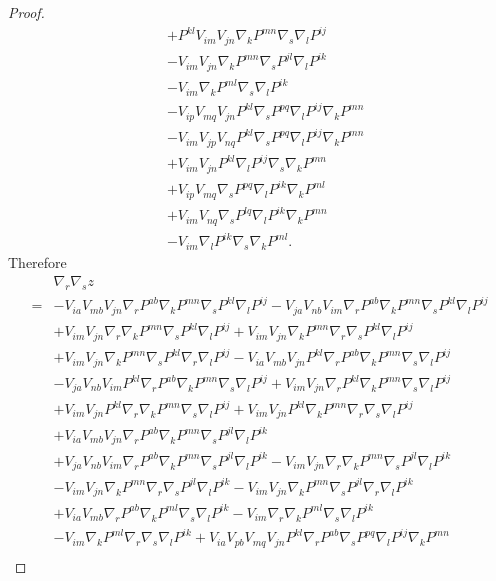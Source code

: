 \documentclass{amsart}
\theoremstyle{definition}
\theoremstyle{remark}
\numberwithin{equation}{section}
\begin{document}
\begin{proof}
\begin{align*}
&+P^{kl}V_{im}V_{jn}\nabla_kP^{mn}\nabla_s\nabla_l P^{ij}\\
&-V_{im}V_{jn}\nabla_kP^{mn}\nabla_sP^{jl}\nabla_lP^{ik}\\
&-V_{im}\nabla_kP^{ml}\nabla_s\nabla_lP^{ik}\\
&-V_{ip}V_{mq}V_{jn}P^{kl}\nabla_sP^{pq}\nabla_l P^{ij}\nabla_kP^{mn}\\
&-V_{im}V_{jp}V_{nq}P^{kl}\nabla_sP^{pq}\nabla_l P^{ij}\nabla_kP^{mn}\\
&+V_{im}V_{jn}P^{kl}\nabla_l P^{ij}\nabla_s\nabla_kP^{mn}\\
&+V_{ip}V_{mq}\nabla_sP^{pq}\nabla_lP^{ik}\nabla_kP^{ml}\\
&+V_{im}V_{nq}\nabla_sP^{lq}\nabla_lP^{ik}\nabla_kP^{mn}\\
&-V_{im}\nabla_lP^{ik}\nabla_s\nabla_kP^{ml}.
\end{align*}
Therefore
\begin{align*}
&\nabla_r\nabla_s z\\
=&-V_{ia}V_{mb}V_{jn}\nabla_r P^{ab}\nabla_kP^{mn}\nabla_s P^{kl}\nabla_l P^{ij}-V_{ja}V_{nb}V_{im}\nabla_r P^{ab}\nabla_kP^{mn}\nabla_s P^{kl}\nabla_l P^{ij}\\
&+V_{im}V_{jn}\nabla_r\nabla_kP^{mn}\nabla_s P^{kl}\nabla_l P^{ij}+V_{im}V_{jn}\nabla_kP^{mn}\nabla_r\nabla_s P^{kl}\nabla_l P^{ij}\\
&+V_{im}V_{jn}\nabla_kP^{mn}\nabla_s P^{kl}\nabla_r\nabla_l P^{ij}-V_{ia}V_{mb}V_{jn}P^{kl}\nabla_rP^{ab}\nabla_kP^{mn}\nabla_s\nabla_l P^{ij}\\
&-V_{ja}V_{nb}V_{im}P^{kl}\nabla_rP^{ab}\nabla_kP^{mn}\nabla_s\nabla_l P^{ij}+V_{im}V_{jn}\nabla_rP^{kl}\nabla_kP^{mn}\nabla_s\nabla_l P^{ij}\\
&+V_{im}V_{jn}P^{kl}\nabla_r\nabla_kP^{mn}\nabla_s\nabla_l P^{ij}+V_{im}V_{jn}P^{kl}\nabla_kP^{mn}\nabla_r\nabla_s\nabla_l P^{ij}\\
&+V_{ia}V_{mb}V_{jn}\nabla_rP^{ab}\nabla_kP^{mn}\nabla_sP^{jl}\nabla_lP^{ik}\\
&+V_{ja}V_{nb}V_{im}\nabla_rP^{ab}\nabla_kP^{mn}\nabla_sP^{jl}\nabla_lP^{ik}-V_{im}V_{jn}\nabla_r\nabla_kP^{mn}\nabla_sP^{jl}\nabla_lP^{ik}\\
&-V_{im}V_{jn}\nabla_kP^{mn}\nabla_r\nabla_sP^{jl}\nabla_lP^{ik}-V_{im}V_{jn}\nabla_kP^{mn}\nabla_sP^{jl}\nabla_r\nabla_lP^{ik}\\
&+V_{ia}V_{mb}\nabla_rP^{ab}\nabla_kP^{ml}\nabla_s\nabla_lP^{ik}-V_{im}\nabla_r\nabla_kP^{ml}\nabla_s\nabla_lP^{ik}\\
&-V_{im}\nabla_kP^{ml}\nabla_r\nabla_s\nabla_lP^{ik}+V_{ia}V_{pb}V_{mq}V_{jn}P^{kl}\nabla_rP^{ab}\nabla_sP^{pq}\nabla_l P^{ij}\nabla_kP^{mn}\\

\end{align*}
\end{proof}
\end{document}
